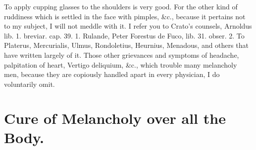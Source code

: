 To apply cupping glasses to the shoulders is very good. For the
other kind of ruddiness which is settled in the face with pimples, \&c.,
because it pertains not to my subject, I will not meddle with it. I
refer you to Crato's counsels, Arnoldus lib. 1. breviar. cap. 39. 1.
Rulande, Peter Forestus de Fuco, lib. 31. obser. 2. To Platerus,
Mercurialis, Ulmus, Rondoletius, Heurnius, Menadous, and others that
have written largely of it.
Those other grievances and symptoms of headache, palpitation of heart,
Vertigo deliquium, \&c., which trouble many melancholy men, because they
are copiously handled apart in every physician, I do voluntarily omit.


\section{Cure of Melancholy over all the Body.}

